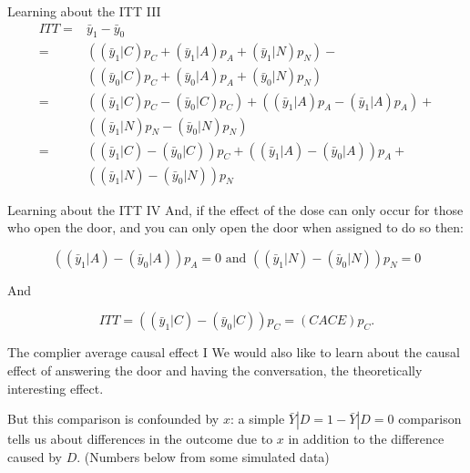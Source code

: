\documentclass[
  ignorenonframetext,
]{beamer}
\begin{document}
\begin{frame}{Learning about the ITT III}
\protect\hypertarget{learning-about-the-itt-iii}{}
\begin{align}
ITT     = &   \bar{y}_{1} - \bar{y}_{0} \\
        = &  ( (\bar{y}_{1}|C)p_C + (\bar{y}_{1}|A)p_A + (\bar{y}_1|N)p_N ) - \\
       & ( (\bar{y}_{0}|C)p_C + (\bar{y}_{0}|A)p_A + (\bar{y}_{0}|N)p_N )  \\
        = &   ( (\bar{y}_{1}|C)p_C -  (\bar{y}_{0}|C)p_C )  +   ( (\bar{y}_{1}|A)p_A - (\bar{y}_{1}|A)p_A ) + \\
       & ( (\bar{y}_1|N)p_N  - (\bar{y}_{0}|N)p_N ) \\
        = &   ( (\bar{y}_{1}|C) -  (\bar{y}_{0}|C))p_C   +   ( (\bar{y}_{1}|A)- (\bar{y}_{0}|A))p_A  + \\
       & ( (\bar{y}_1|N) - (\bar{y}_{0}|N) )p_N
\end{align}
\end{frame}

\begin{frame}{Learning about the ITT IV}
\protect\hypertarget{learning-about-the-itt-iv}{}
And, if the effect of the dose can only occur for those who open the
door, and you can only open the door when assigned to do so then:

\begin{equation}
( (\bar{y}_{1}|A)- (\bar{y}_{0}|A))p_A = 0  \text{ and } ( (\bar{y}_1|N) - (\bar{y}_{0}|N) )p_N = 0
\end{equation}

And

\begin{equation}
ITT =  ( (\bar{y}_{1}|C) -  (\bar{y}_{0}|C))p_C  = ( CACE ) p_C.
\end{equation}
\end{frame}

\begin{frame}{The complier average causal effect I}
\protect\hypertarget{the-complier-average-causal-effect-i}{}
We would also like to learn about the causal effect of answering the
door and having the conversation, the theoretically interesting effect.

But this comparison is confounded by \(x\): a simple
\(\bar{Y}|D=1 - \bar{Y}|D=0\) comparison tells us about differences in
the outcome due to \(x\) in addition to the difference caused by \(D\).
(Numbers below from some simulated data)

\begin{center}
\end{center}
\end{frame}
\end{document}
